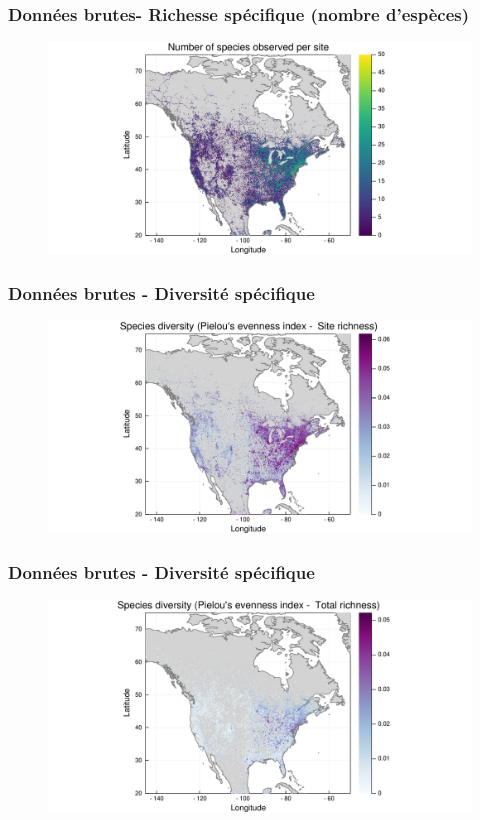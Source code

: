 \documentclass[10pt]{beamer}
\begin{document}
\begin{frame}
  \frametitle{Données brutes- Richesse spécifique (nombre d'espèces)}
  \begin{figure}
    \centering
    \includegraphics[scale=0.4]{fig/raw-richness.pdf}
  \end{figure}
\end{frame}

\begin{frame}
  \frametitle{Données brutes - Diversité spécifique}
  \begin{figure}
    \centering
    \includegraphics[scale=0.4]{fig/raw-diversity-pielou.pdf}
  \end{figure}
\end{frame}

\begin{frame}
  \frametitle{Données brutes - Diversité spécifique}
  \begin{figure}
    \centering
    \includegraphics[scale=0.4]{fig/raw-diversity-pielou2.pdf}
  \end{figure}
\end{frame}
\end{document}
